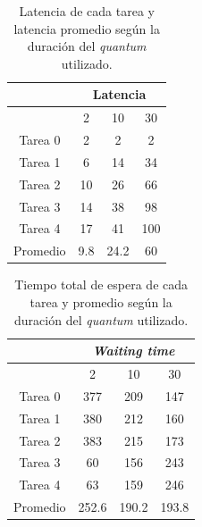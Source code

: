 \begin{table}[H]
  \center
  \begin{center}
  \begin{tabular}{c|c|c|c|}
    \cline{2-4}
    & \multicolumn{3}{|c|}{\cellcolor{LightCyan}Latencia} \\
    \hline
    \rowcolor{LightCyan}
    \multicolumn{1}{|c|}{Quantum} & 2 & 10 & 30 \\
    \hline
    \multicolumn{1}{|c|}{\cellcolor{LightCyan}Tarea 0} & 2 & 2 & 2 \\
    \multicolumn{1}{|c|}{\cellcolor{LightCyan}Tarea 1} & 6 & 14 & 34 \\
    \multicolumn{1}{|c|}{\cellcolor{LightCyan}Tarea 2} & 10 & 26 & 66 \\
    \multicolumn{1}{|c|}{\cellcolor{LightCyan}Tarea 3} & 14 & 38 & 98 \\
    \multicolumn{1}{|c|}{\cellcolor{LightCyan}Tarea 4} & 17 & 41 & 100 \\
    \hline
    \multicolumn{1}{|c|}{\cellcolor{LightCyan}Promedio} & 9.8 & 24.2 & 60 \\
    \hline
  \end{tabular}
  \end{center}
  \caption{\footnotesize Latencia de cada tarea y latencia promedio según la duración del \emph{quantum} utilizado.}
  \label{tab:ej5-1}
\end{table}

\begin{table}[H]
  \center
  \begin{center}
  \begin{tabular}{c|c|c|c|}
    \cline{2-4}
    & \multicolumn{3}{|c|}{\cellcolor{LightCyan}\emph{Waiting time}} \\
    \hline
    \rowcolor{LightCyan}
    \multicolumn{1}{|c|}{Quantum} & 2 & 10 & 30 \\
    \hline
    \multicolumn{1}{|c|}{\cellcolor{LightCyan}Tarea 0} & 377 & 209 & 147 \\
    \multicolumn{1}{|c|}{\cellcolor{LightCyan}Tarea 1} & 380 & 212 & 160 \\
    \multicolumn{1}{|c|}{\cellcolor{LightCyan}Tarea 2} & 383 & 215 & 173 \\
    \multicolumn{1}{|c|}{\cellcolor{LightCyan}Tarea 3} & 60 & 156 & 243 \\
    \multicolumn{1}{|c|}{\cellcolor{LightCyan}Tarea 4} & 63 & 159 & 246 \\
    \hline
    \multicolumn{1}{|c|}{\cellcolor{LightCyan}Promedio} & 252.6 & 190.2 & 193.8 \\
    \hline
  \end{tabular}
  \end{center}
  \caption{\footnotesize Tiempo total de espera de cada tarea y promedio según la duración del \emph{quantum} utilizado.}
  \label{tab:ej5-2}
\end{table}

